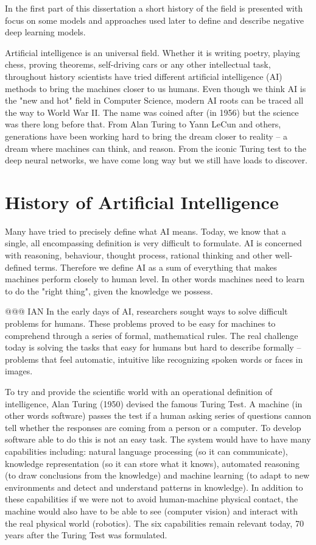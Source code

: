 \documentclass[b5paper]{book}
\begin{document}
In the first part of this dissertation a short history of the field is presented with focus on some models and approaches used later to define and describe negative deep learning models. 

Artificial intelligence is an universal field. Whether it is writing poetry, playing chess, proving theorems, self-driving cars or any other intellectual task, throughout history scientists have tried different artificial intelligence (AI) methods to bring the machines closer to us humans. Even though we think AI is the "new and hot" field in Computer Science, modern AI roots can be traced all the way to World War II. The name was coined after (in 1956) but the science was there long before that. From Alan Turing to Yann LeCun and others, generations have been working hard to bring the dream closer to reality -- a dream where machines can think, and reason. From the iconic Turing test to the deep neural networks, we have come long way but we still have loads to discover.

\section{History of Artificial Intelligence}

Many have tried to precisely define what AI means. Today, we know that a single, all encompassing definition is very difficult to formulate. AI is concerned with reasoning, behaviour, thought process, rational thinking and other well-defined terms. Therefore we define AI as a sum of everything that makes machines perform closely to human level. In other words machines need to learn to do the "right thing", given the knowledge we possess.

@@@ IAN
In the early days of AI, researchers sought ways to solve difficult problems for humans. These problems proved to be easy for machines to comprehend through a series of formal, mathematical rules. The real challenge today is solving the tasks that easy for humans but hard to describe formally -- problems that feel automatic, intuitive like recognizing spoken words or faces in images.

To try and provide the scientific world with an operational definition of intelligence, Alan Turing (1950) devised the famous Turing Test. A machine (in other words software) passes the test if a human asking series of questions cannon tell whether the responses are coming from a person or a computer. To develop software able to do this is not an easy task. The system would have to have many capabilities including: natural language processing (so it can communicate), knowledge representation (so it can store what it knows), automated reasoning (to draw conclusions from the knowledge) and machine learning (to adapt to new environments and detect and understand patterns in knowledge). In addition to these capabilities if we were not to avoid human-machine physical contact, the machine would also have to be able to see (computer vision) and interact with the real physical world (robotics). The six capabilities remain relevant today, 70 years after the Turing Test was formulated.
\end{document}
